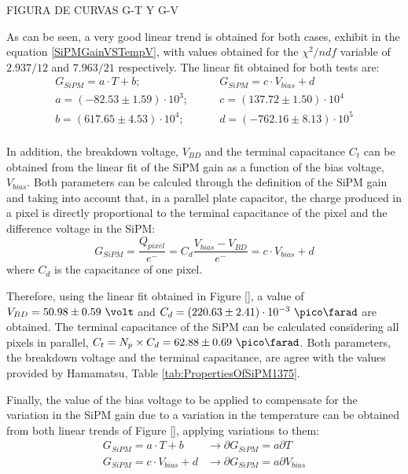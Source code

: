 FIGURA DE CURVAS G-T Y G-V 

As can be seen, a very good linear trend is obtained for both cases, exhibit in the equation \ref{SiPMGainVSTempV}, with values obtained for the $\chi^2/ndf$ variable of $2.937/12$ and $7.963/21$ respectively. The linear fit obtained for both tests are:
\begin{equation*}
\begin{split}
G_{SiPM}=a \cdot{} T + b;& \qquad G_{SiPM}=c \cdot{} V_{bias} + d\\
a=\left( -82.53 \pm 1.59 \right) \cdot{} 10^{3};& \qquad c=\left( 137.72 \pm 1.50 \right) \cdot{} 10^{4}\\
b=\left( 617.65 \pm 4.53 \right) \cdot{} 10^{4};& \qquad d=\left( -762.16 \pm 8.13 \right) \cdot{} 10^{5} \\
\label{SiPMGainVSTempV}
\end{split}
\end{equation*} 

In addition, the breakdown voltage, $V_{BD}$ and the terminal capacitance $C_t$ can be obtained from the linear fit of the SiPM gain as a function of the bias voltage, $V_{bias}$. Both parameters can be calculed through the definition of the SiPM gain and taking into account that, in a parallel plate capacitor, the charge produced in a pixel is directly proportional to the terminal capacitance of the pixel and the difference voltage in the SiPM:
\begin{equation}
G_{SiPM}=\frac{Q_{pixel}}{e^-} = C_d \frac{V_{bias}-V_{BD}}{e^-} = c \cdot{} V_{bias}+d
\label{SiPMGain_Capacitance}
\end{equation}
where $C_d$ is the capacitance of one pixel.

Therefore, using the linear fit obtained in Figure \ref{}, a value of $V_{BD}=50.98 \pm 0.59~\volt$ and $C_d{}= \left( 220.63 \pm 2.41 \right) \cdot{} 10^{-3} ~\pico\farad$ are obtained. The terminal capacitance of the SiPM can be calculated considering all pixels in parallel, $C_{t}=N_{p}\times C_{d}=62.88 \pm 0.69~\pico\farad$. Both parameters, the breakdown voltage and the terminal capacitance, are agree with the values provided by Hamamatsu, Table \ref{tab:PropertiesOfSiPM1375}. 

Finally, the value of the bias voltage to be applied to compensate for the variation in the SiPM gain due to a variation in the temperature can be obtained from both linear trends of Figure \ref{}, applying variations to them:
\begin{equation*}
\begin{split}
G_{SiPM}=a \cdot{} T + b  &\longrightarrow \partial G_{SiPM}= a \partial T\\
G_{SiPM}=c \cdot{} V_{bias} + d &\longrightarrow \partial G_{SiPM}= a \partial V_{bias}
\label{Gain_compensationVariations}
\end{split}
\end{equation*} 

